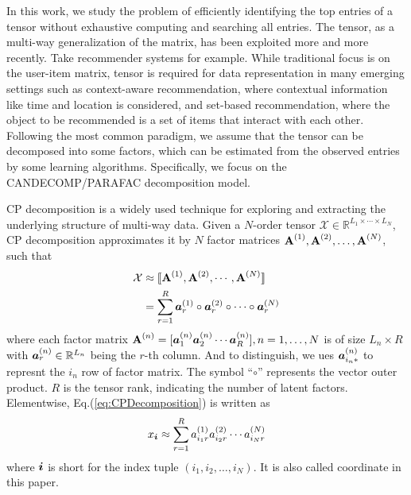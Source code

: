\documentclass[letterpaper]{article}
\newcommand{\Sca}[3]{{#1}^{(#2)}_{i_#2#3}}%
\newcommand{\anr}[2]{\Sca{a}{#1}{#2}}
\newcommand{\T}[1]{\mathcal{#1}}
\newcommand{\KT}[1]{\llbracket #1 \rrbracket}
\newcommand{\V}[1]{{\boldsymbol{{\MakeLowercase{#1}}}}}
\newcommand{\ColVec}[3]{\V{#1}^{(#2)}_{#3}}
\newcommand{\RowVecA}[1]{\V{a}^{(#1)}_{i_#1*}}
\newcommand{\M}[1]{{\textbf{{\MakeUppercase{#1}}}}}
\newcommand{\FacMat}[2]{\M{#1}^{(#2)}}
\newcommand{\Eqn}[1]{Eq.(\ref{eq:#1})}
\begin{document}
In this work, 
we study the problem of efficiently identifying the top entries of a tensor 
without exhaustive computing and searching all entries. 
The tensor, as a multi-way generalization of the matrix, 
has been exploited more and more recently. 
Take recommender systems for example. 
While traditional focus is on the user-item matrix\cite{KoYe09}, 
tensor\cite{Rendle_PITF,HuYiLa15} is required for data representation in many emerging settings 
such as context-aware recommendation, 
where contextual information like time and location is considered, and set-based recommendation, 
where the object to be recommended is a set of items that interact with each other. 
Following the most common paradigm, we assume that the tensor can be decomposed into some factors, 
which can be estimated from the observed entries by some learning algorithms. 
Specifically, we focus on the CANDECOMP/PARAFAC decomposition model.

CP decomposition\cite{KoBa09} is a widely used technique for exploring and 
extracting the underlying structure of multi-way data. 
Given a $N$-order tensor $\T{X}\in\mathbb{R}^{L_1\times \cdots\times L_N}$, 
CP decomposition approximates it by $N$ factor matrices $\FacMat{A}{1},\FacMat{A}{2},\ldots,\FacMat{A}{N}$, 
such that
\begin{align}
\label{eq:CPDecomposition}
\T{X}&\approx\KT{\FacMat{A}{1},\FacMat{A}{2},\cdots,\FacMat{A}{N}} \\ \notag
&=\sum_{r=1}^R\ColVec{a}{1}{r}\circ\ColVec{a}{2}{r}\circ\cdots\circ\ColVec{a}{N}{r}
\end{align}
where each factor matrix 
$\FacMat{A}{n}=[\ColVec{a}{n}{1}\ColVec{a}{n}{2}\cdots\ColVec{a}{n}{R}], n=1,\ldots,N$
is of size $L_n\times R$ with $\ColVec{a}{n}{r}\in\mathbb{R}^{L_n}$ 
being the $r$-th column.
And to distinguish, we ues $\RowVecA{n}$ to represnt the $i_n$ row of factor matrix.
The symbol ``$\circ$'' represents the vector outer product. 
$R$ is the tensor rank, indicating the number of latent factors. 
Elementwise, \Eqn{CPDecomposition} is written as
\begin{align}
\label{eq:CPValue}
x_\V{i} \approx \sum_{r=1}^{R}\anr{1}{r}\anr{2}{r}\cdots\anr{N}{r}
\end{align}
where $\V{i}$ is short for the index tuple $(i_1,i_2,\ldots,i_N)$.
It is also called coordinate in this paper.
\end{document}
